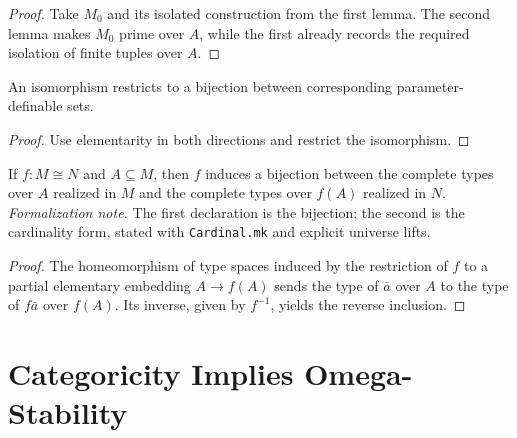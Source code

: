 \begin{proof}
Take \(M_0\) and its isolated construction from the first lemma.  The
second lemma makes \(M_0\) prime over \(A\), while the first already
records the required isolation of finite tuples over \(A\).
\end{proof}

\begin{lemma}
\label{lem:isomorphism-preserves-definable-set-cardinality}
An isomorphism restricts to a bijection between corresponding
parameter-definable sets.
\end{lemma}

\begin{proof}
Use elementarity in both directions and restrict the isomorphism.
\end{proof}

\begin{lemma}
\label{lem:isomorphism-preserves-realized-type-counts}
\leanok
{}
If \(f:M\cong N\) and \(A\subseteq M\), then \(f\) induces a bijection
between the complete types over \(A\) realized in \(M\) and the complete
types over \(f(A)\) realized in \(N\).
\emph{Formalization note.}  The first declaration is the bijection; the
second is the cardinality form, stated with \texttt{Cardinal.mk} and
explicit universe lifts.
\end{lemma}

\begin{proof}
\leanok
{}
The homeomorphism of type spaces induced by the restriction of \(f\) to
a partial elementary embedding \(A\to f(A)\) sends the type of
\(\bar a\) over \(A\) to the type of \(f\bar a\) over \(f(A)\).  Its
inverse, given by \(f^{-1}\), yields the reverse inclusion.
\end{proof}

\section{Categoricity Implies Omega-Stability}

